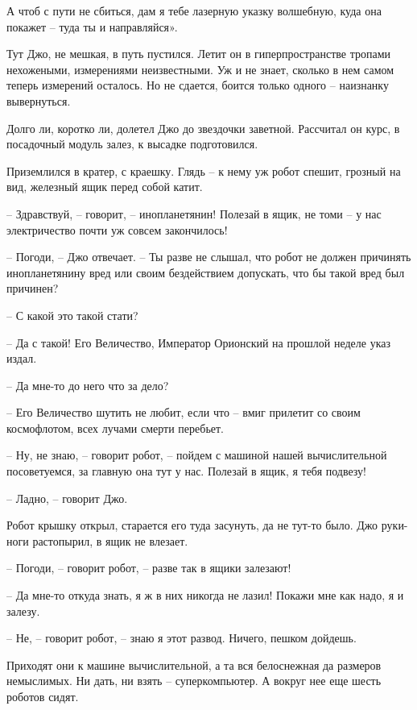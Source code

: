 \documentclass[ebook,oneside,final,openright]{memoir}
\begin{document}
\par
А чтоб с пути не сбиться, дам я тебе лазерную указку волшебную, куда она покажет – туда ты и направляйся».\par
\par
Тут Джо, не мешкая, в путь пустился. Летит он в гиперпространстве тропами нехожеными, измерениями неизвестными. Уж и не знает, сколько в нем самом теперь измерений осталось. Но не сдается, боится только одного – наизнанку вывернуться.\par
\par
Долго ли, коротко ли, долетел Джо до звездочки заветной. Рассчитал он курс, в посадочный модуль залез, к высадке подготовился.\par
\par
Приземлился в кратер, с краешку. Глядь – к нему уж робот спешит, грозный на вид, железный ящик перед собой катит.\par
– Здравствуй, – говорит, – инопланетянин! Полезай в ящик, не томи – у нас электричество почти уж совсем закончилось!\par
– Погоди, – Джо отвечает. – Ты разве не слышал, что робот не должен причинять инопланетянину вред или своим бездействием допускать, что бы такой вред был причинен?\par
– С какой это такой стати?\par
– Да с такой! Его Величество, Император Орионский на прошлой неделе указ издал.\par
– Да мне-то до него что за дело?\par
– Его Величество шутить не любит, если что – вмиг прилетит со своим космофлотом, всех лучами смерти перебьет.\par
– Ну, не знаю, – говорит робот, – пойдем с машиной нашей вычислительной посоветуемся, за главную она тут у нас. Полезай в ящик, я тебя подвезу!\par
– Ладно, – говорит Джо.\par
Робот крышку открыл, старается его туда засунуть, да не тут-то было. Джо руки-ноги растопырил, в ящик не влезает. \par
– Погоди, – говорит робот, – разве так в ящики залезают! \par
– Да мне-то откуда знать, я ж в них никогда не лазил! Покажи мне как надо, я и залезу. \par
– Не, – говорит робот, – знаю я этот развод. Ничего, пешком дойдешь.\par
\par
Приходят они к машине вычислительной, а та вся белоснежная да размеров немыслимых. Ни дать, ни взять – суперкомпьютер. А вокруг нее еще шесть роботов сидят. \par
\end{document}
